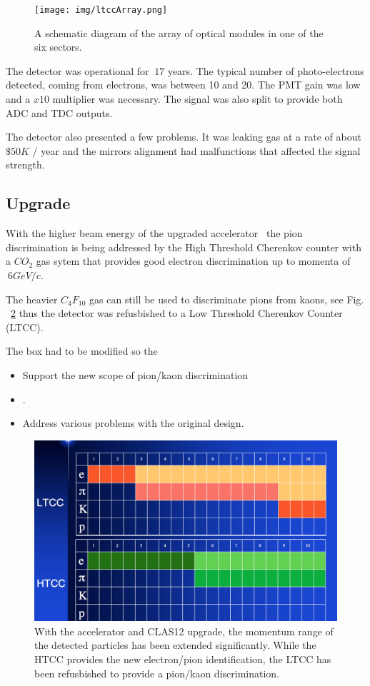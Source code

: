 \begin{figure}[hbt]
	\centering
	\texttt{[image: img/ltccArray.png]}
	\caption{A schematic diagram of the array of optical modules in one of the six sectors.}
	\label{fig:ltccArray}
\end{figure}

The detector was operational for $~17$ years. The typical number of photo-electrons detected, coming from electrons, was between 10 and 20.
The PMT gain was low and a $x10$ multiplier was necessary. The signal was also split to provide both ADC and TDC outputs.

The detector also presented a few problems. It was leaking gas at a rate of about $\$50K$ / year and the mirrors alignment had malfunctions that affected
the signal strength.


\subsection{Upgrade}

With the higher beam energy of the upgraded accelerator~\cite{TDR12} the pion discrimination is being addressed
by the High Threshold Cherenkov counter with a $CO_2$ gas sytem that provides good electron discrimination up to momenta of $~6 GeV/c$.

The heavier $C_4F_{10}$ gas can still be used to discriminate pions from kaons, see Fig. ~\ref{fig:newScope} thus the detector was refusbished
to a Low Threshold Cherenkov Counter (LTCC).

The box had to be modified so the

\begin{itemize}
	\item Support the new scope of pion/kaon discrimination
	\item .
	\item Address various problems with the original design.
\end{itemize}



\begin{figure}[hbt]
	\centering
	\includegraphics[width=1.0\columnwidth,keepaspectratio]{img/newScope.png}
	\caption{With the accelerator and CLAS12 upgrade, the momentum range of the detected particles has been extended significantly. While the HTCC
            provides the new electron/pion identification, the LTCC has been refusbished to provide a pion/kaon discrimination.}
	\label{fig:newScope}
\end{figure}
